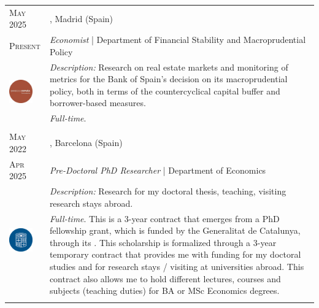 %
%


\vspace{2.0 mm}

\begin{longtable}{R{2.5cm}|p{14.8cm}}

	\textsc{May 2025} & \textsc{}, \faMapMarker \hspace{0.5 mm} Madrid (Spain) \\
 	\textsc{Present} 	& \textit{Economist} | Department of Financial Stability and Macroprudential Policy \\
	 & 
	\footnotesize{\faTasks \emph{ Description: }Research on real estate markets and monitoring of metrics for the Bank of Spain's decision on its macroprudential policy, both in terms of the countercyclical capital buffer and borrower-based measures.} \\ &
	\footnotesize{\faFileText \emph{ Full-time}.} \\
 	 \\
	
 	\textsc{May 2022} & \textsc{}, \faMapMarker \hspace{0.5 mm} Barcelona (Spain) \\
 	\textsc{Apr 2025} 	& \textit{Pre-Doctoral PhD Researcher} | Department of Economics \\
	 & 
	\footnotesize{\faTasks \emph{ Description: }Research for my doctoral thesis, teaching, visiting research stays abroad.} \\ &
	\footnotesize{\faFileText \emph{ Full-time}. This is a 3-year contract that emerges from a PhD fellowship grant, which is funded by the Generalitat de Catalunya, through its . This scholarship is formalized through a 3-year temporary contract that provides me with funding for my doctoral studies and for research stays / visiting at universities abroad. This contract also allows me to hold different lectures, courses and subjects (teaching duties) for BA or MSc Economics degrees.}\\
 	 \\
	

\end{longtable}

